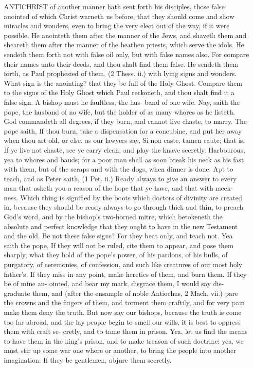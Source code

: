 \documentclass{custom}
\begin{document}
ANTICHRIST of another manner hath sent forth his 
disciples, those false anointed of which Christ warneth 
us before, that they should come and show miracles and 
wonders, even to bring the very elect out of the way, if it 
were possible. He anointeth them after the manner of 
the Jews, and shaveth them and sheareth them after the 
manner of the heathen priests, which serve the idols. He 
sendeth them forth not with false oil only, but with false 
names also. For compare their names unto their deeds, 
and thou shalt find them false. He sendeth them forth, 
as Paul prophesied of them, (2 Thess. ii.) with lying signs 
and wonders. What sign is the anointing? that they 
be full of the Holy Ghost. Compare them to the signs 
of the Holy Ghost which Paul reckoneth, and thou shalt 
find it a false sign. A bishop must he faultless, the hus- 
band of one wife. Nay, saith the pope, the husband of 
no wife, but the holder of as many whores as he listeth. 
God commandeth all degrees, if they burn, and cannot live 
chaste, to marry. The pope saith, If thou burn, take a 
dispensation for a concubine, and put her away when thou 
art old, or else, as our lawyers say, Si non caste, tamen 
caute; that is, If ye live not chaste, see ye carry clean, and 
play the knave secretly. Harbourous, yea to whores and 
bauds; for a poor man shall as soon break his neck as his 
fast with them, but of the scraps and with the dogs, when 
dinner is done. Apt to teach, and as Peter saith, (1 Pet. ii.) 
Ready always to give an answer to every man that asketh 
you a reason of the hope that ye have, and that with meek- 
ness. Which thing is signified by the boots which doctors 
of divinity are created in, because they should be ready 
always to go through thick and thin, to preach God's word, 
and by the bishop's two-horned mitre, which betokeneth 
the absolute and perfect knowledge that they ought to 
have in the new Testament and the old. Be not these 
false signs? For they beat only, and teach not. Yea 
saith the pope, If they will not be ruled, cite them to 
appear, and pose them sharply, what they hold of the 
pope's power, of his pardons, of his bulls, of purgatory, 
of ceremonies, of confession, and such like creatures of 
our most holy father's. If they miss in any point, make 
heretics of them, and burn them. If they be of mine an- 
ointed, and bear my mark, disgrace them, I would say dis- 
graduate them, and (after the ensample of noble Antiochus, 
2 Mach. vii.) pare the crowns and the fingers of them, 
and torment them craftily, and for very pain make them 
deny the truth. But now say our bishops, because the 
truth is come too far abroad, and the lay people begin to 
smell our wills, it is best to oppress them with craft se- 
cretly, and to tame them in prison. Yea, let us find the 
means to have them in the king's prison, and to make 
treason of such doctrine: yea, we must stir up some war 
one where or another, to bring the people into another 
imagination. If they be gentlemen, abjure them secretly. 
\end{document}
